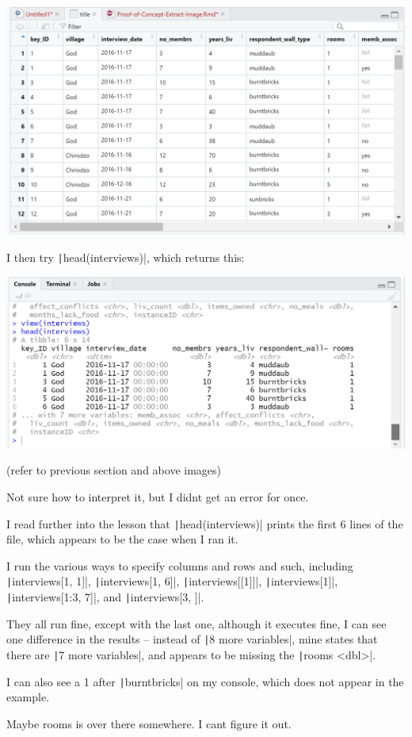 \documentclass{article}
\begin{document}
\includegraphics[width=1.0\textwidth]{rstudio_17.PNG}

I then try \texttt|head(interviews)|, which returns this:

\includegraphics[width=1.0\textwidth]{rstudio_18.PNG}


{\item (refer to previous section and above images)
\item Not sure how to interpret it, but I didnt get an error for once.
\item I read further into the lesson that \texttt|head(interviews)| prints the first 6 lines of the file, which appears to be the case when I ran it.
\item I run the various ways to specify columns and rows and such, including \texttt|interviews[1, 1]|, \texttt|interviews[1, 6]|, \texttt|interviews[[1]]|, \texttt|interviews[1]|, \texttt|interviews[1:3, 7]|, and \texttt|interviews[3, ]|.
\item They all run fine, except with the last one, although it executes fine, I can see one difference in the results – instead of \texttt|8 more variables|, mine states that there are \texttt|7 more variables|, and appears to be missing the \texttt|rooms <dbl>|.
\item I can also see a 1 after \texttt|burntbricks| on my console, which does not appear in the example.
\item Maybe rooms is over there somewhere. I cant figure it out.}
\end{document}
